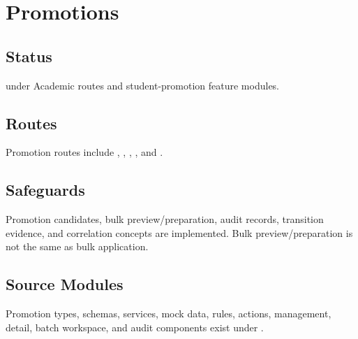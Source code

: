 \chapter{Promotions}
\section{Status}
\implemented{} under Academic routes and student-promotion feature modules.

\section{Routes}
Promotion routes include , , , , and .

\section{Safeguards}
Promotion candidates, bulk preview/preparation, audit records, transition evidence, and correlation concepts are implemented. Bulk preview/preparation is not the same as bulk application.

\section{Source Modules}
Promotion types, schemas, services, mock data, rules, actions, management, detail, batch workspace, and audit components exist under .
